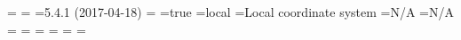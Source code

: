 \legendtitle={\thfb{}      \mainfont{}}
\cavename={\thfb{}           \mainfont{}}
\northarrowtrue
\scalebartrue
\thversion={5.4.1 (2017-04-18)}
\currentdate={\thfb{}          \mainfont{}}
\northdir={true}
\outcscode={local}
\outcsname={Local coordinate system}
\magdecl={N/A}
\gridconv={N/A}
\cavelengthtitle={\thfb{}      \mainfont{}}
\cavelength={\thfb{}    \thinspace {} \mainfont{}}
\cavedepthtitle={\thfb{}     \mainfont{}}
\cavedepth={\thfb{}  \thinspace {} \mainfont{}}
\cavemaxz={\thfb{}  \mainfont{}}
\caveminz={\thfb{}   \mainfont{}}
